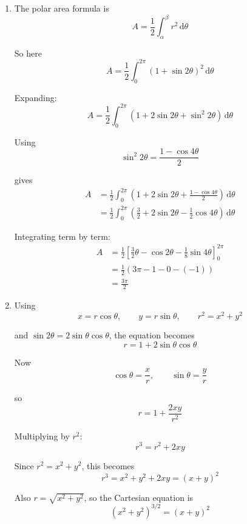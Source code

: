 \documentclass[leqno]{article}
\begin{document}
\begin{enumerate}[
	  label=\textbf{\arabic*.},
	  leftmargin=*,
	  topsep=0pt,
	  partopsep=0pt,
	  parsep=0pt
	]
\begin{djsSolution}
\begin{enumerate}[label=\textbf{(\alph*)}]
	  Now \(\sin 2\theta=1\) when
	  \[
	  2\theta=\frac{\pi}{2},\ \frac{5\pi}{2}
	  \]

	  so
	  \[
	  \theta=\frac{\pi}{4},\ \frac{5\pi}{4}
	  \]

	  Therefore the points have polar coordinates
	  \[
	  \left(2,\frac{\pi}{4}\right) \quad \text{and} \quad \left(2,\frac{5\pi}{4}\right)
	  \]
	
	  \item The polar area formula is
	  \[
	  A=\frac12\int_{\alpha}^{\beta} r^2\,\mathrm{d}\theta
	  \]

	  So here
	  \[
	  A=\frac12\int_0^{2\pi}(1+\sin 2\theta)^2\,\mathrm{d}\theta
	  \]

	  Expanding:
	  \[
	  A=\frac12\int_0^{2\pi}\left(1+2\sin 2\theta+\sin^2 2\theta\right)\,\mathrm{d}\theta
	  \]

	  Using
	  \[
	  \sin^2 2\theta=\frac{1-\cos 4\theta}{2}
	  \]

	  gives
	  \begin{align*}
	  A&=\frac12\int_0^{2\pi}\left(1+2\sin 2\theta+\frac{1-\cos 4\theta}{2}\right)\,\mathrm{d}\theta \\
	   &=\frac12\int_0^{2\pi}\left(\frac32+2\sin 2\theta-\frac12\cos 4\theta\right)\,\mathrm{d}\theta
	  \end{align*}

	  Integrating term by term:
	  \begin{align*}
	  A&=\frac12\left[\frac32\theta-\cos 2\theta-\frac18\sin 4\theta\right]_0^{2\pi} \\
	   &=\frac12\left(3\pi-1-0-(-1)\right) \\
	   &=\frac{3\pi}{2}
	  \end{align*}
	
	  \item Using
	  \[
	  x=r\cos\theta,\qquad y=r\sin\theta,\qquad r^2=x^2+y^2
	  \]

	  and \(\sin 2\theta=2\sin\theta\cos\theta\), the equation becomes
	  \[
	  r=1+2\sin\theta\cos\theta
	  \]

	  Now
	  \[
	  \cos\theta=\frac{x}{r},\qquad \sin\theta=\frac{y}{r}
	  \]

	  so
	  \[
	  r=1+\frac{2xy}{r^2}
	  \]

	  Multiplying by \(r^2\):
	  \[
	  r^3=r^2+2xy
	  \]

	  Since \(r^2=x^2+y^2\), this becomes
	  \[
	  r^3=x^2+y^2+2xy=(x+y)^2
	  \]

	  Also \(r=\sqrt{x^2+y^2}\), so the Cartesian equation is
	  \[
	  (x^2+y^2)^{3/2}=(x+y)^2
	  \]
\end{enumerate}
\end{djsSolution}
	

\end{enumerate}
\end{document}

